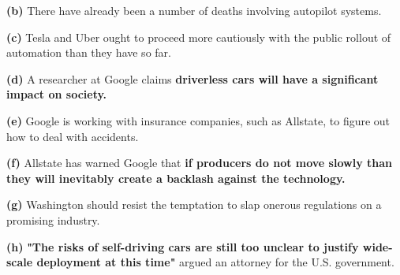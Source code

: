 \documentclass[11pt]{article}
\renewcommand\part[1]{\vspace{.10in}\textbf{(#1)}}
\begin{document}
\part{b} There have already been a number of deaths involving autopilot systems.


\part{c} Tesla and Uber ought to proceed more cautiously with the public rollout of automation than they have so far.


\part{d} A researcher at Google claims \textbf{driverless cars will have a significant impact on society.}


\part{e} Google is working with insurance companies, such as Allstate, to figure out how to deal with accidents.


\part{f} Allstate has warned Google that \textbf{if producers do not move slowly than they will inevitably create a backlash against the technology.}


\part{g} Washington should resist the temptation to slap onerous regulations on a promising industry.


\part{h} \textbf{"The risks of self-driving cars are still too unclear to justify wide-scale deployment at this time"} argued an attorney for the U.S. government.
\end{document}
